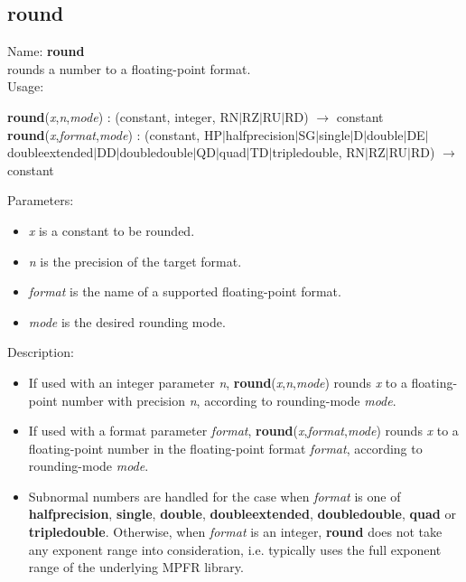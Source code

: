 \subsection{round}
\label{labround}
\noindent Name: \textbf{round}\\
rounds a number to a floating-point format.\\
\noindent Usage: 
\begin{center}
\textbf{round}(\emph{x},\emph{n},\emph{mode}) : (\textsf{constant}, \textsf{integer}, \textsf{RN$|$RZ$|$RU$|$RD}) $\rightarrow$ \textsf{constant}\\
\textbf{round}(\emph{x},\emph{format},\emph{mode}) : (\textsf{constant}, \textsf{HP$|$halfprecision$|$SG$|$single$|$D$|$double$|$DE$|$doubleextended$|$DD$|$doubledouble$|$QD$|$quad$|$TD$|$tripledouble}, \textsf{RN$|$RZ$|$RU$|$RD}) $\rightarrow$ \textsf{constant}\\
\end{center}
Parameters: 
\begin{itemize}
\item \emph{x} is a constant to be rounded.
\item \emph{n} is the precision of the target format.
\item \emph{format} is the name of a supported floating-point format.
\item \emph{mode} is the desired rounding mode.
\end{itemize}
\noindent Description: \begin{itemize}

\item If used with an integer parameter \emph{n}, \textbf{round}(\emph{x},\emph{n},\emph{mode}) rounds \emph{x} to a floating-point number with 
   precision \emph{n}, according to rounding-mode \emph{mode}. 

\item If used with a format parameter \emph{format}, \textbf{round}(\emph{x},\emph{format},\emph{mode}) rounds \emph{x} to a floating-point number in the 
   floating-point format \emph{format}, according to rounding-mode \emph{mode}. 

\item Subnormal numbers are handled for the case when \emph{format} is one of
   \textbf{halfprecision}, \textbf{single}, \textbf{double}, \textbf{doubleextended}, \textbf{doubledouble},
   \textbf{quad} or \textbf{tripledouble}. Otherwise, when \emph{format} is an integer,
   \textbf{round} does not take any exponent range into consideration,
   i.e. typically uses the full exponent range of the underlying MPFR
   library.
\end{itemize}
